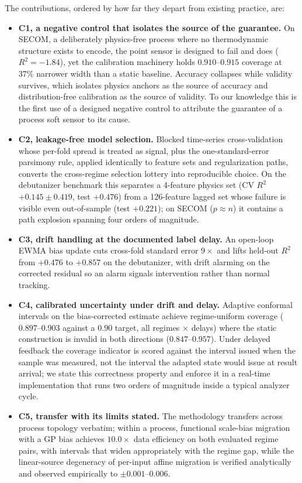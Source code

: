 The contributions, ordered by how far they depart from existing practice, are:

\begin{itemize}
\tightlist
\item
  \textbf{C1, a negative control that isolates the source of the guarantee.} On SECOM,
  a deliberately physics-free process where no thermodynamic structure exists to encode,
  the point sensor is designed to fail and does ($R^2 = -1.84$), yet the calibration
  machinery holds $0.910$--$0.915$ coverage at $37\%$ narrower width than a static
  baseline. Accuracy collapses while validity survives, which isolates physics anchors
  as the source of accuracy and distribution-free calibration as the source of validity.
  To our knowledge this is the first use of a designed negative control to attribute the
  guarantee of a process soft sensor to its cause.
\item
  \textbf{C2, leakage-free model selection.} Blocked time-series cross-validation whose
  per-fold spread is treated as signal, plus the one-standard-error parsimony rule,
  applied identically to feature sets and regularization paths, converts the cross-regime
  selection lottery into reproducible choice. On the debutanizer benchmark this separates
  a 4-feature physics set (CV $R^2$ $+0.145 \pm 0.419$, test $+0.476$) from a 126-feature
  lagged set whose failure is visible even out-of-sample (test $+0.221$); on SECOM
  ($p \approx n$) it contains a path explosion spanning four orders of magnitude.
\item
  \textbf{C3, drift handling at the documented label delay.} An open-loop EWMA bias
  update cuts cross-fold standard error $9\times$ and lifts held-out $R^2$ from $+0.476$
  to $+0.857$ on the debutanizer, with drift alarming on the corrected residual so an
  alarm signals intervention rather than normal tracking.
\item
  \textbf{C4, calibrated uncertainty under drift and delay.} Adaptive conformal intervals
  on the bias-corrected estimate achieve regime-uniform coverage ($0.897$--$0.903$ against
  a $0.90$ target, all regimes $\times$ delays) where the static construction is invalid in
  both directions ($0.847$--$0.957$). Under delayed feedback the coverage indicator is
  scored against the interval issued when the sample was measured, not the interval the
  adapted state would issue at result arrival; we state this correctness property and
  enforce it in a real-time implementation that runs two orders of magnitude inside a
  typical analyzer cycle.
\item
  \textbf{C5, transfer with its limits stated.} The methodology transfers across process
  topology verbatim; within a process, functional scale-bias migration with a GP bias
  achieves $10.0\times$ data efficiency on both evaluated regime pairs, with intervals
  that widen appropriately with the regime gap, while the linear-source degeneracy of
  per-input affine migration is verified analytically and observed empirically to
  $\pm 0.001$--$0.006$.
\end{itemize}

